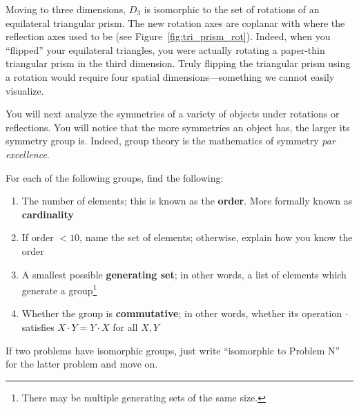 \documentclass[../textbook.tex]{subfiles}
\begin{document}
\noindent Moving to three dimensions, $D_3$ is isomorphic to the set of rotations of an equilateral triangular prism. The new rotation axes are coplanar with where the reflection axes used to be (see Figure~\ref{fig:tri_prism_rot}). Indeed, when you ``flipped'' your equilateral triangles, you were actually rotating a paper-thin triangular prism in the third dimension. Truly flipping the triangular prism using a rotation would require four spatial dimensions---something we cannot easily visualize.

You will next analyze the symmetries of a variety of objects under rotations or reflections. You will notice that the more symmetries an object has, the larger its symmetry group is. Indeed, group theory is the mathematics of symmetry \textit{par excellence}.

For each of the following groups, find the following:

\begin{enumerate}[label=(\alph*)]
\item The number of elements; this is known as the \textbf{order}. More formally known as \textbf{cardinality}
\item If order $< 10$, name the set of elements; otherwise, explain how you know the order
\item A smallest possible \textbf{generating set}; in other words, a list of elements which generate a group\footnote{There may be multiple generating sets of the same size.}
\item Whether the group is \textbf{commutative}; in other words, whether its operation $\cdot$ satisfies $X\cdot Y=Y\cdot X$ for all $X,Y$ %
\end{enumerate}

\noindent If two problems have isomorphic groups, just write ``isomorphic to Problem N'' for the latter problem and move on.
\end{document}
